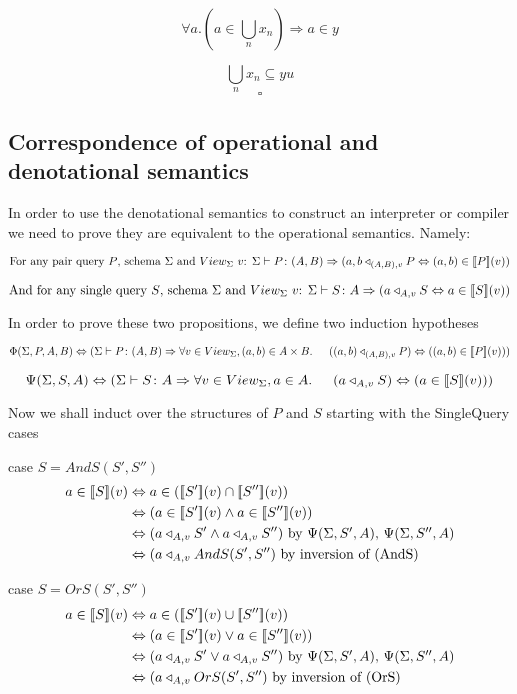 \documentclass[twoside,a4paper,11pt]{article}
\newcommand{\db}[1]{{\bf [\![}#1{\bf ]\!]}}
\newcommand{\deno}[1]{\db{#1}(v)}
\newcommand{\typeRule}[2]{\Sigma\vdash #1 \colon #2}
\newcommand{\denoRule}[2]{#1 \in \deno{#2}}
\newcommand{\opRule}[3]{#1 \triangleleft_{#2, v} #3}
\newcommand{\phiRule}[3]{\Phi(\Sigma, #1, #2, #3)}
\newcommand{\psiRule}[2]{\Psi(\Sigma, #1, #2)}
\begin{document}
$$\forall a. (a \in \bigcup_n x_n) \Rightarrow a \in y$$

$$\bigcup_n x_n \subseteq yu$$
$$ \square$$

\subsection{Correspondence of operational and denotational semantics}

In order to use the denotational semantics to construct an interpreter or compiler we need to prove they are equivalent to the operational semantics. Namely:


$$
\mbox{For any pair query $P$, schema $\Sigma$ and $View_{\Sigma}$ $v$: }
\typeRule{P}{(A, B)}\Rightarrow \opRule{(a, b}{(A, B)}{P} \Leftrightarrow \denoRule{(a, b)}{P})
$$

$$
\mbox{And for any single query $S$, schema $\Sigma$ and $View_{\Sigma}$ $v$: }
\typeRule{S}{A}\Rightarrow \opRule{(a}{A}{S} \Leftrightarrow \denoRule{a}{S})
$$

In order to prove these two propositions, we define two induction hypotheses



$$
\phiRule{P}{A}{B} \Leftrightarrow (\typeRule{P}{(A, B)} \Rightarrow \forall v \in View_{\Sigma}, (a, b) \in A \times B. \indent (\opRule{(a, b)}{(A, B)}{P}) \Leftrightarrow (\denoRule{(a, b)}{P}))
$$

$$
\psiRule{S}{A} \Leftrightarrow (\typeRule{S}{A} \Rightarrow \forall v \in View_{\Sigma}, a \in A. \indent (\opRule{a}{A}{S}) \Leftrightarrow (\denoRule{a}{S}))
$$

Now we shall induct over the structures of $P$ and $S$ starting with the SingleQuery cases


case $S = AndS(S', S'')$
\begin{equation} \label{case AndS}
\begin{split}
\denoRule{a}{S} & \Leftrightarrow a \in (\deno{S'} \cap \deno{S''}) \\
				& \Leftrightarrow (\denoRule{a}{S'} \wedge \denoRule{a}{S''}) \\
				& \Leftrightarrow (\opRule{a}{A}{S'} \wedge \opRule{a}{A}{S''}) \mbox{ by $\psiRule{S'}{A}$, $\psiRule{S''}{A}$}\\
				& \Leftrightarrow (\opRule{a}{A}{AndS(S', S'')} \mbox{ by inversion of (AndS)}
\end{split}
\end{equation}

case $S = OrS(S', S'')$
\begin{equation} \label{case OrS}
\begin{split}
\denoRule{a}{S} & \Leftrightarrow a \in (\deno{S'} \cup \deno{S''}) \\
				& \Leftrightarrow (\denoRule{a}{S'} \vee \denoRule{a}{S''}) \\
				& \Leftrightarrow (\opRule{a}{A}{S'} \vee \opRule{a}{A}{S''}) \mbox{ by $\psiRule{S'}{A}$, $\psiRule{S''}{A}$}\\
				& \Leftrightarrow (\opRule{a}{A}{OrS(S', S'')} \mbox{ by inversion of (OrS)}
\end{split}
\end{equation}
\end{document}
